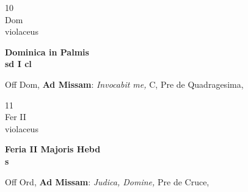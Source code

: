 \documentclass[10pt, openany]{book}
\begin{document}
        \begin{center}
            \begin{minipage}{3.5in}
                \vspace{2em}
                \begin{minipage}{0.5in}
                    {\Huge 10} \\
                    {\normalsize Dom} \\
                    {\normalsize violaceus}
                \end{minipage}
                \begin{minipage}{3.0in}
                    \textbf{ \large Dominica in Palmis \\
                    \textnormal{\normalsize sd I cl}} \\ 
                \end{minipage}
                \begin{justify}Off Dom, \textbf{Ad Missam}: \textit{Invocabit me,} C, Pre de Quadragesima,   
                \end{justify}
            \end{minipage}
        \end{center}
    
        \begin{center}
            \begin{minipage}{3.5in}
                \vspace{2em}
                \begin{minipage}{0.5in}
                    {\Huge 11} \\
                    {\normalsize Fer II} \\
                    {\normalsize violaceus}
                \end{minipage}
                \begin{minipage}{3.0in}
                    \textbf{ \large Feria II Majoris Hebd \\
                    \textnormal{\normalsize s}} \\ 
                \end{minipage}
                \begin{justify}Off Ord, \textbf{Ad Missam}: \textit{Judica, Domine,} Pre de Cruce,   
                \end{justify}
            \end{minipage}
        \end{center}
    
\end{document}
